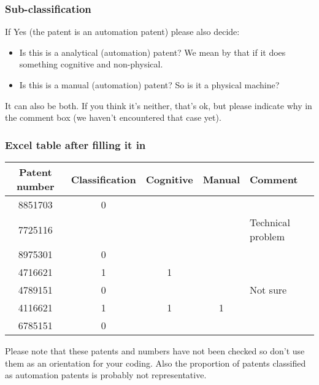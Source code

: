 \documentclass[10pt]{beamer}
\begin{document}
\begin{frame}\frametitle{Sub-classification}
If Yes (the patent is an automation patent) please also decide:
	\begin{itemize}
	\item Is this is a analytical (automation) patent? We mean by that if it does something cognitive and non-physical.
	\item Is this is a manual (automation) patent? So is it a physical machine?
	\end{itemize}
It can also be both. If you think it's neither, that's ok, but please indicate why in the comment box (we haven't encountered that case yet).
\end{frame}


\begin{frame}\frametitle{Excel table after filling it in}
\vspace{-1cm}
\begin{table}
\begin{small}
  \begin{threeparttable}
     \begin{tabular}{ccccl}
        \textbf{Patent number} & \textbf{Classification} & \textbf{Cognitive} & \textbf{Manual} & \textbf{Comment}  \tabularnewline
        \hline
        8851703	& 0  &  &  &	\tabularnewline
        7725116 & 	 &  &  &	Technical problem\tabularnewline
        8975301 & 0	 &  &  &	\tabularnewline
        4716621 & 1	 & 1 &  &	\tabularnewline
        4789151 & 0	 &  &  & 	Not sure\tabularnewline
        4116621 & 1	 & 1 & 1 &	\tabularnewline
        6785151 & 0	 &  &  & 	\tabularnewline
        \hline
     \end{tabular}
  \end{threeparttable}
\end{small}
\end{table}
\vspace{0.5cm}
{\small \textcolor{mytextgrey}{Please note that these patents and numbers have not been checked so don't use them as an orientation for your coding. Also the proportion of patents classified as automation patents is probably not representative.} }

\end{frame}
\end{document}
